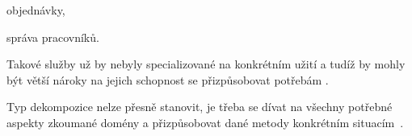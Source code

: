 \begin{ul}
   \item objednávky,
   \item správa pracovníků.
\end{ul}


Takové služby už by nebyly specializované na konkrétním užití a tudíž by mohly být větší nároky na jejich schopnost se přizpůsobovat potřebám .

Typ dekompozice nelze přesně stanovit, je třeba se dívat na všechny potřebné aspekty zkoumané domény a přizpůsobovat dané metody konkrétním situacím~\cite{msachris}.

